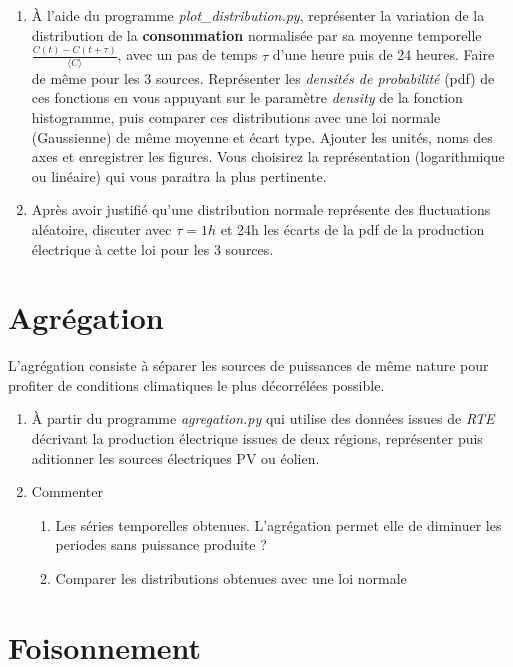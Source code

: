 \documentclass{article}
\newcommand{\tmtextbf}[1]{{\bfseries{#1}}}
\newcommand{\tmtextit}[1]{{\itshape{#1}}}
\begin{document}
\begin{enumerate}
  \item À l'aide du programme \tmtextit{plot\_distribution.py}, représenter
  la variation de la distribution de la \tmtextbf{consommation} normalisée
  par sa moyenne temporelle $\frac{C (t) - C (t + \tau)}{\langle C \rangle}$,
  avec un pas de temps $\tau$ d'une heure puis de 24 heures. Faire de même
  pour les 3 sources. Représenter les \tmtextit{densités de probabilité}
  (pdf) de ces fonctions en vous appuyant sur le paramètre \tmtextit{density}
  de la fonction histogramme, puis comparer ces distributions avec une loi
  normale (Gaussienne) de même moyenne et écart type. Ajouter les unités,
  noms des axes et enregistrer les figures. Vous choisirez la représentation
  (logarithmique ou linéaire) qui vous paraitra la plus pertinente.
  
  \item Après avoir justifié qu'une distribution normale représente des
  fluctuations aléatoire, discuter avec $\tau = 1 h$ et 24h les écarts de la
  pdf de la production électrique à cette loi pour les 3 sources.
\end{enumerate}

\section{Agrégation}

L'agrégation consiste à séparer les sources de puissances de même nature
pour profiter de conditions climatiques le plus décorrélées possible.
\begin{enumerate}
  \item À partir du programme \tmtextit{agregation.py} qui utilise des
  données issues de \tmtextit{RTE} décrivant la production électrique
  issues de deux régions, représenter puis aditionner les sources
  électriques PV ou éolien.
  
  \item Commenter
  \begin{enumerate}
    \item Les séries temporelles obtenues. L'agrégation permet elle de
    diminuer les periodes sans puissance produite ?
    
    \item Comparer les distributions obtenues avec une loi normale
  \end{enumerate}
\end{enumerate}

\section{Foisonnement}
\end{document}
